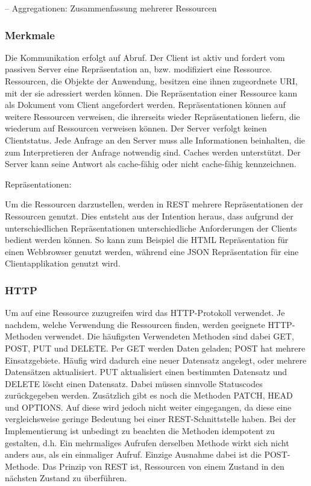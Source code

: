–	Aggregationen: Zusammenfassung mehrerer Ressourcen

\subsubsection{Merkmale}
\label{sec:RESTMerkmale}

Die Kommunikation erfolgt auf Abruf. Der Client ist aktiv und fordert vom passiven Server eine Repräsentation an, bzw. modifiziert eine Ressource. Ressourcen, die Objekte der Anwendung, besitzen eine ihnen zugeordnete \ac{URI}, mit der sie adressiert werden können. Die Repräsentation einer Ressource kann als Dokument vom Client angefordert werden. Repräsentationen können auf weitere Ressourcen verweisen, die ihrerseits wieder Repräsentationen liefern, die wiederum auf Ressourcen verweisen können. Der Server verfolgt keinen Clientstatus. Jede Anfrage an den Server muss alle Informationen beinhalten, die zum Interpretieren der Anfrage notwendig sind. Caches werden unterstützt. Der Server kann seine Antwort als cache-fähig oder nicht cache-fähig kennzeichnen.

Repräsentationen:

Um die Ressourcen darzustellen, werden in REST mehrere Repräsentationen der Ressourcen genutzt. Dies entsteht aus der Intention heraus, dass aufgrund der unterschiedlichen Repräsentationen unterschiedliche Anforderungen der Clients bedient werden können. So kann zum Beispiel die \ac{HTML} Repräsentation für einen Webbrowser genutzt werden, während eine \ac{JSON} Repräsentation für eine Clientapplikation genutzt wird.

\subsubsection{HTTP}
\label{sec:RESTHTTP}


Um auf eine Ressource zuzugreifen wird das \ac{HTTP}-Protokoll verwendet. Je nachdem, welche Verwendung die Ressourcen finden, werden geeignete \ac{HTTP}-Methoden verwendet. Die häufigsten Verwendeten Methoden sind dabei GET, POST, PUT und DELETE. Per GET werden Daten geladen; POST hat mehrere Einsatzgebiete. Häufig wird dadurch eine neuer Datensatz angelegt, oder mehrere Datensätzen aktualisiert. PUT aktualisiert einen bestimmten Datensatz und DELETE löscht einen Datensatz. Dabei müssen sinnvolle Statuscodes zurückgegeben werden. Zusätzlich gibt es noch die Methoden PATCH, HEAD und OPTIONS. Auf diese wird jedoch nicht weiter eingegangen, da diese eine vergleichsweise geringe Bedeutung bei einer REST-Schnittstelle haben. Bei der Implementierung ist unbedingt zu beachten die Methoden idempotent zu gestalten, d.h. Ein mehrmaliges Aufrufen derselben Methode wirkt sich nicht anders aus, als ein einmaliger Aufruf. Einzige Ausnahme dabei ist die POST-Methode. Das Prinzip von \ac{REST} ist, Ressourcen von einem Zustand in den nächsten Zustand zu überführen.

